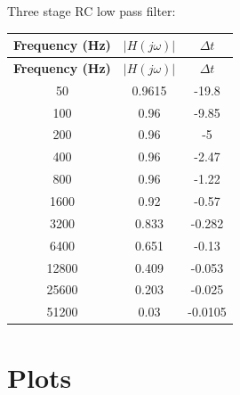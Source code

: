 \documentclass[a4paper,12pt]{article}
\begin{document}
Three stage RC low pass filter:\\
\begin{longtable}{|c|c|c|}
\hline
\textbf{Frequency (Hz)} & \textbf{$|H(j\omega)|$} & \textbf{$\Delta t$} \\
\hline
\endfirsthead
\hline
\textbf{Frequency (Hz)} & \textbf{$|H(j\omega)|$} & \textbf{$\Delta t$} \\
\hline
\endhead
\hline
\endfoot
\hline
\endlastfoot
50 & 0.9615 & -19.8 \\
100 & 0.96 & -9.85 \\
200 & 0.96 & -5 \\
400 & 0.96 & -2.47 \\
800 & 0.96 & -1.22 \\
1600 & 0.92 & -0.57 \\
3200 & 0.833 & -0.282 \\
6400 & 0.651 & -0.13 \\
12800 & 0.409 & -0.053 \\
25600 & 0.203 & -0.025 \\
51200 & 0.03 & -0.0105 \\
\end{longtable}
\section{Plots}
\end{document}
